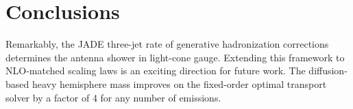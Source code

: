 \section{Conclusions}\label{sec:conclusions}

Remarkably, the JADE three-jet rate of generative hadronization
corrections determines the antenna shower in light-cone gauge. Extending
this framework to NLO-matched scaling laws is an exciting direction for
future work. The diffusion-based heavy hemisphere mass improves on the
fixed-order optimal transport solver by a factor of 4 for any number of
emissions.

